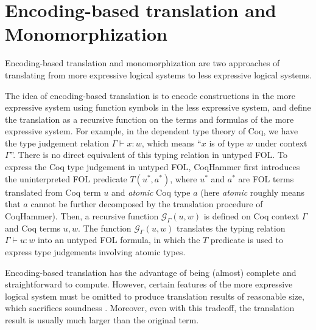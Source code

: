 \section{Encoding-based translation and Monomorphization}\label{subencmon}

  Encoding-based translation and monomorphization
  are two approaches of translating from more expressive logical systems to
  less expressive logical systems.

  The idea of encoding-based translation is to encode
  constructions in the more expressive system using function symbols in the less
  expressive system, and define the translation as a recursive function on the terms and formulas
  of the more expressive system. For example, in the dependent type theory of Coq,
  we have the type judgement relation $\Gamma \vdash x : w$, which means ``$x$ is of
  type $w$ under context $\Gamma$''. There is no direct equivalent of this
  typing relation in untyped FOL. To express the Coq type judgement in untyped FOL, 
  CoqHammer first introduces the uninterpreted FOL predicate $T(u^*, a^*)$, where
  $u^*$ and $a^*$ are FOL terms translated from Coq term $u$ and \textit{atomic} Coq type $a$
  (here \textit{atomic} roughly means that $a$ cannot be
  further decomposed by the translation procedure of CoqHammer). Then, a recursive function
  $\mathcal{G}_\Gamma(u, w)$ is defined on Coq context $\Gamma$ and Coq terms $u, w$.
  The function $\mathcal{G}_\Gamma(u, w)$ translates the typing relation $\Gamma \vdash u : w$ into an untyped FOL formula,
  in which the $T$ predicate is used to express type judgements involving atomic types.
  
  Encoding-based translation has the advantage of being (almost) complete
  and straightforward to compute. However, certain features of the more expressive
  logical system must be omitted to produce translation results of reasonable size,
  which sacrifices soundness \cite{Czajka2018HammerFC}. Moreover, even with this tradeoff,
  the translation result is usually much larger than the original term.

